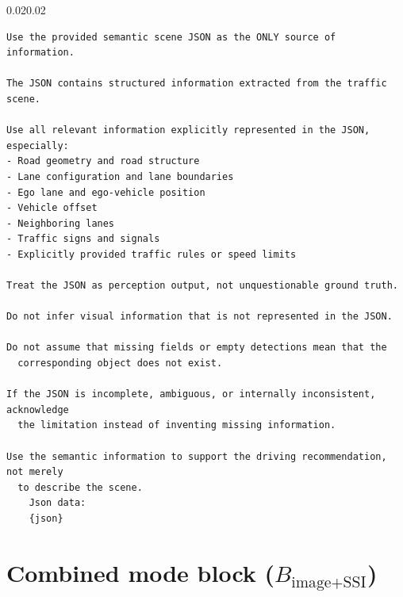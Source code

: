 \documentclass[12pt,a4paper]{report}
\begin{document}
\begin{adjustwidth}{0.02\linewidth}{0.02\linewidth}
\begin{framed}
\footnotesize
\begin{verbatim}
Use the provided semantic scene JSON as the ONLY source of information.

The JSON contains structured information extracted from the traffic scene.

Use all relevant information explicitly represented in the JSON, especially:
- Road geometry and road structure
- Lane configuration and lane boundaries
- Ego lane and ego-vehicle position
- Vehicle offset
- Neighboring lanes
- Traffic signs and signals
- Explicitly provided traffic rules or speed limits

Treat the JSON as perception output, not unquestionable ground truth.

Do not infer visual information that is not represented in the JSON.

Do not assume that missing fields or empty detections mean that the
  corresponding object does not exist.

If the JSON is incomplete, ambiguous, or internally inconsistent, acknowledge
  the limitation instead of inventing missing information.

Use the semantic information to support the driving recommendation, not merely
  to describe the scene.
    Json data:
    {json}
\end{verbatim}
\end{framed}
\end{adjustwidth}

\section{Combined mode block (\texorpdfstring{$B_{\text{image+SSI}}$}{B_image+SSI})}
\end{document}
